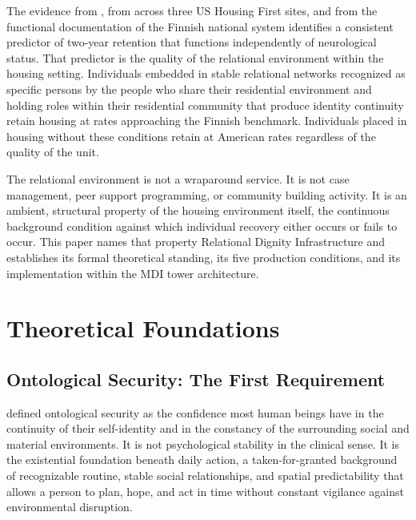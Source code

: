 \documentclass[12pt, letterpaper]{article}
\begin{document}
The evidence from \citet{padgett_2007}, from \citet{tsai_2012} across three US Housing First sites, and from the \citet{yfoundation_2022} functional documentation of the Finnish national system identifies a consistent predictor of two-year retention that functions independently of neurological status. That predictor is the quality of the relational environment within the housing setting. Individuals embedded in stable relational networks recognized as specific persons by the people who share their residential environment and holding roles within their residential community that produce identity continuity retain housing at rates approaching the Finnish benchmark. Individuals placed in housing without these conditions retain at American rates regardless of the quality of the unit.

The relational environment is not a wraparound service. It is not case management, peer support programming, or community building activity. It is an ambient, structural property of the housing environment itself, the continuous background condition against which individual recovery either occurs or fails to occur. This paper names that property Relational Dignity Infrastructure and establishes its formal theoretical standing, its five production conditions, and its implementation within the MDI tower architecture.

\clearpage
\section{Theoretical Foundations}

\subsection{Ontological Security: The First Requirement}

\citet{giddens_1991} defined ontological security as the confidence most human beings have in the continuity of their self-identity and in the constancy of the surrounding social and material environments. It is not psychological stability in the clinical sense. It is the existential foundation beneath daily action, a taken-for-granted background of recognizable routine, stable social relationships, and spatial predictability that allows a person to plan, hope, and act in time without constant vigilance against environmental disruption.
\end{document}
